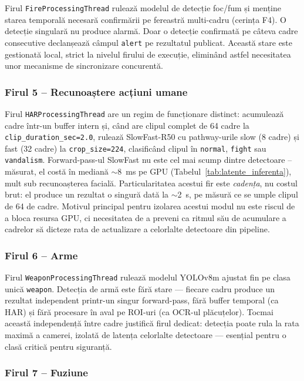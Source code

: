 \documentclass[../../main.tex]{subfiles}
\begin{document}
Firul \texttt{FireProcessingThread} rulează modelul de detecție foc/fum și menține starea temporală necesară confirmării pe fereastră multi-cadru (cerința F4). O detecție singulară nu produce alarmă. Doar o detecție confirmată pe câteva cadre consecutive declanșează câmpul \texttt{alert} pe rezultatul publicat. Această stare este gestionată local, strict la nivelul firului de execuție, eliminând astfel necesitatea unor mecanisme de sincronizare concurentă.

\subsubsection{Firul 5 -- Recunoaștere acțiuni umane}

Firul \texttt{HARProcessingThread} are un regim de funcționare distinct: acumulează cadre într-un buffer intern și, când are clipul complet de 64 cadre la \linebreak \texttt{clip\_duration\_sec=2.0}, rulează SlowFast-R50 cu pathway-urile slow (8 cadre) și fast (32 cadre) la \texttt{crop\_size=224}, clasificând clipul în \texttt{normal}, \texttt{fight} sau \texttt{vandalism}. Forward-pass-ul SlowFast nu este cel mai scump dintre detectoare -- măsurat, el costă în mediană $\sim$8~ms pe GPU (Tabelul~\ref{tab:latente_inferenta}), mult sub recunoașterea facială. Particularitatea acestui fir este \emph{cadența}, nu costul brut: el produce un rezultat o singură dată la $\sim$2~s, pe măsură ce se umple clipul de 64 de cadre. Motivul principal pentru izolarea acestui modul nu este riscul de a bloca resursa GPU, ci necesitatea de a preveni ca ritmul său de acumulare a cadrelor să dicteze rata de actualizare a celorlalte detectoare din pipeline.

\subsubsection{Firul 6 -- Arme}

Firul \texttt{WeaponProcessingThread} rulează modelul YOLOv8m ajustat fin pe clasa unică \texttt{weapon}. Detecția de armă este fără stare — fiecare cadru produce un rezultat independent printr-un singur forward-pass, fără buffer temporal (ca HAR) și fără procesare în aval pe ROI-uri (ca OCR-ul plăcuțelor). Tocmai această independență între cadre justifică firul dedicat: detecția poate rula la rata maximă a camerei, izolată de latența celorlalte detectoare — esențial pentru o clasă critică pentru siguranță.

\subsubsection{Firul 7 -- Fuziune}
\end{document}
